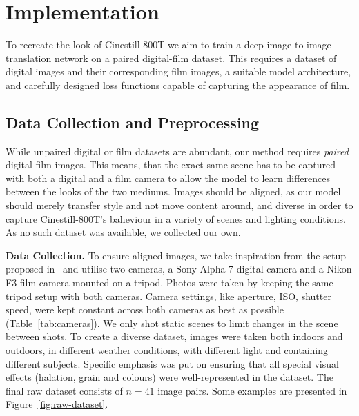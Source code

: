\section{Implementation}
\label{sec:implementation}


To recreate the look of Cinestill-800T we aim to train a deep image-to-image
translation network on a paired digital-film dataset. This requires a dataset of
digital images and their corresponding film images, a suitable model
architecture, and carefully designed loss functions capable of capturing the appearance of film.

\subsection{Data Collection and Preprocessing}
\label{subsec:data}
\label{subsubsec:data-collection}

While unpaired digital or film datasets are abundant, our method requires \textit{paired} digital-film images. This means, that the exact same scene has to be captured with both a digital and a film camera to allow the model to learn differences between the looks of the two mediums. Images should be aligned, as our model should merely transfer style and not move content around, and diverse in order to capture Cinestill-800T's baheviour in a variety of scenes and lighting conditions. As no such dataset was available, we collected our own.

\textbf{Data Collection. } To ensure aligned images, we take inspiration from the setup proposed in~\cite{dslr-quality} and utilise two cameras, a Sony Alpha 7 digital camera and a Nikon F3 film camera mounted on a tripod. Photos were taken by keeping the same tripod setup with both cameras. Camera settings, like aperture, ISO, shutter speed, were kept constant across both cameras as best as possible (Table~\ref{tab:cameras}). We only shot static scenes to limit changes in the scene between shots. To create a diverse dataset, images were taken both indoors and outdoors, in different weather conditions, with different light and containing different subjects. Specific emphasis was put on ensuring that all special visual effects (halation, grain and colours) were well-represented in the dataset. The final raw dataset consists of $n=41$ image pairs. Some examples are presented in Figure~\ref{fig:raw-dataset}. 


